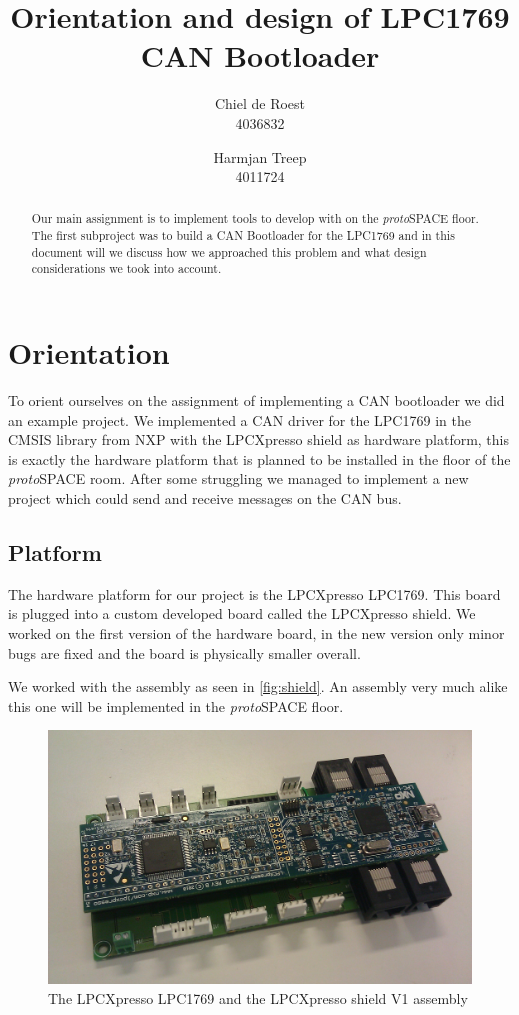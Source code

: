 \documentclass[twocolumn]{article}
\title{Orientation and design of LPC1769 CAN Bootloader}
\author{Chiel de Roest\\4036832 \and Harmjan Treep\\4011724}
\date{}
\newcommand{\protospace}{\textit{proto}SPACE }
\begin{document}
\maketitle

\begin{abstract}
	Our main assignment is to implement tools to develop with on the \protospace floor.
	The first subproject was to build a CAN Bootloader for the LPC1769 and in this document will we discuss how we approached this problem and what design considerations we took into account.
\end{abstract}

\section*{Orientation}
	To orient ourselves on the assignment of implementing a CAN bootloader we did an example project.
	We implemented a CAN driver for the LPC1769 in the CMSIS library from NXP with the LPCXpresso shield as hardware platform,
	this is exactly the hardware platform that is planned to be installed in the floor of the \protospace room.
	After some struggling we managed to implement a new project which could send and receive messages on the CAN bus.
	
	\subsection*{Platform}
		The hardware platform for our project is the LPCXpresso LPC1769.
		This board is plugged into a custom developed board called the LPCXpresso shield.
		We worked on the first version of the hardware board,
		in the new version only minor bugs are fixed and the board is physically smaller overall.
		
		We worked with the assembly as seen in \autoref{fig:shield}.
		An assembly very much alike this one will be implemented in the \protospace floor.
		\begin{figure}[htbp]
			\centering
			\includegraphics[width=\columnwidth]{LPCXpressoShieldAssembly}
			\caption{The LPCXpresso LPC1769 and the LPCXpresso shield V1 assembly}
			\label{fig:shield}
		\end{figure}
	
\end{document}
